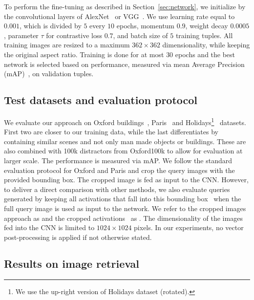 To perform the fine-tuning as described in Section~\ref{sec:network}, we initialize by the convolutional layers of AlexNet~\cite{KSH12} or VGG~\cite{SZ14}.
We use learning rate equal to $0.001$, which is divided by $5$ every $10$ epochs, momentum $0.9$, weight decay $0.0005$, parameter $\tau$ for contrastive loss $0.7$, and batch size of $5$ training tuples.
All training images are resized to a maximum $362 \times 362$ dimensionality, while keeping the original aspect ratio.
Training is done for at most $30$ epochs and the best network is selected based on performance, measured via mean Average Precision (mAP)~\cite{PCISZ07}, on validation tuples. 

\vspace{-5pt}
\subsection{Test datasets and evaluation protocol}
%
We evaluate our approach on Oxford buildings~\cite{PCISZ07}, Paris~\cite{PCISZ08} and Holidays\footnote{We use the up-right version of Holidays dataset (rotated).}~\cite{JDS08} datasets.
First two are closer to our training data, while the last differentiates by containing similar scenes and not only man made objects or buildings. 
These are also combined with 100k distractors from Oxford100k to allow for evaluation at larger scale. 
The performance is measured via mAP. 
We follow the standard evaluation protocol for Oxford and Paris and crop the query images with the provided bounding box. 
The cropped image is fed as input to the CNN.
However, to deliver a direct comparison with other methods, we also evaluate queries generated by keeping all activations that fall into this bounding box~\cite{BL15,AGTPS15} when the full query image is used as input to the network.
We refer to the cropped images approach as \cropI and the cropped activations~\cite{BL15,AGTPS15} as \cropA. 
The dimensionality of the images fed into the CNN is limited to $1024 \times 1024$ pixels.
In our experiments, no vector post-processing is applied if not otherwise stated.

%
%

%
%

%
\subsection{Results on image retrieval}
%
